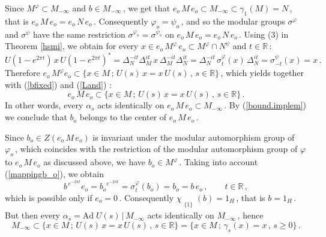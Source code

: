 \documentclass[reqno]{amsart}
\theoremstyle{definition}
\theoremstyle{remark}
\numberwithin{equation}{section}
\theoremstyle{plain}
\begin{document}
Since $M^\varphi\subset M_{-\infty}$ and $b\in M_{-\infty}\,$,
we get that $e_o\, M\, e_o\subset M_{-\infty}\subset
\gamma_1 (M) =N\,$, that is $e_o\, M\, e_o =e_o\, N\, e_o\,$.
Consequently $\varphi_o =\psi_o\,$, and so the modular groups
$\sigma^\varphi$ and $\sigma^\psi$ have the same restriction
$\sigma^{\varphi_o} =\sigma^{\psi_o}$ on $e_o\, M\, e_o =
e_o\, N\, e_o\,$. Using (3) in Theorem \ref{hsmi}, we obtain
for every $x\in e_o\, M^\varphi\, e_o\subset M^\varphi \cap
N^\psi$ and $t\in \mathbb R\,$:
\begin{equation*}
U(1-e^{2\pi t})\, x\, U(1-e^{2\pi t})^* = \Delta_N^{-it}
\Delta_M^{it}\, x\, \Delta_M^{-it}\Delta_N^{it} =
\Delta_N^{-it}\,\sigma^\varphi_t (x)\,\Delta_N^{it} =
\sigma^\psi_{-t} (x) =x\, .
\end{equation*}
Therefore $e_o\, M^\varphi e_o\subset \big\{ x
\in M\, ;\, U(s)\, x =x\, U(s)\, ,\, s\in\mathbb R \big\}\,$,
which yields together with (\ref{bfixed}) and (\ref{Land}) :
\begin{equation*}
e_o\, M\, e_o\subset \big\{ x\in M\, ;\, U(s)\, x =
x\, U(s)\, ,\, s\in\mathbb R \big\}\, .
\end{equation*}
In other words, every $\alpha_s$ acts identically on
$e_o\, M\, e_o\subset M_{-\infty}\,$. By (\ref{bound.implem})
we conclude that $b_o$ belongs to the center of $e_o\, M\, e_o\,$.

Since $b_o\in Z(e_o\, M\, e_o)$ is invariant under the modular
automorphism group of $\varphi_o\,$, which coincides with the
restriction of the modular automorphism group of $\varphi$ to
$e_o\, M\, e_o$ as discussed above, we have $b_o\in M^\varphi\,$.
Taking into account (\ref{mappingb_o}), we obtain
\begin{equation*}
b^{\, e^{-2\pi t}} e_o ={b_o}^{e^{-2\pi t}} =
\sigma^\varphi_t (b_o) =b_o =b\, e_o\, ,\qquad t\in\mathbb R\, ,
\end{equation*}
which is possible only if $e_o=0\,$. Consequently
$\chi_{\substack{{}\\{\{ 1\}}}} (b)=1_H\,$, that is $b=1_H\,$.
But then every $\alpha_s =\text{Ad}\; U(s)\, |\, M_{-\infty}$
acts identically on $M_{-\infty}\,$, hence
\begin{equation*}
M_{-\infty}\subset \big\{ x\in M\, ;\, U(s)\, x =
x\, U(s)\, ,\, s\in\mathbb R \big\} =\big\{ x\in M\, ;\,
\gamma_s (x)=x\, ,\, s\geq 0\big\}\, .
\end{equation*}
\end{document}
